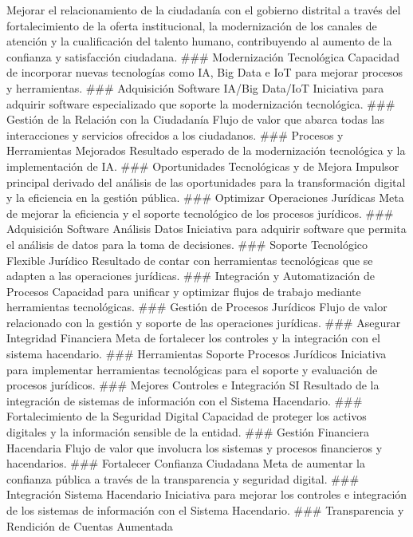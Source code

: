 \documentclass[
	a4paper, %
	12pt, %
]{include/CSSullivanBusinessReport}
\begin{document}
Mejorar el relacionamiento de la ciudadanía con el gobierno distrital a
través del fortalecimiento de la oferta institucional, la modernización
de los canales de atención y la cualificación del talento humano,
contribuyendo al aumento de la confianza y satisfacción ciudadana.
\#\#\# Modernización Tecnológica Capacidad de incorporar nuevas
tecnologías como IA, Big Data e IoT para mejorar procesos y
herramientas. \#\#\# Adquisición Software IA/Big Data/IoT Iniciativa
para adquirir software especializado que soporte la modernización
tecnológica. \#\#\# Gestión de la Relación con la Ciudadanía Flujo de
valor que abarca todas las interacciones y servicios ofrecidos a los
ciudadanos. \#\#\# Procesos y Herramientas Mejorados Resultado esperado
de la modernización tecnológica y la implementación de IA. \#\#\#
Oportunidades Tecnológicas y de Mejora Impulsor principal derivado del
análisis de las oportunidades para la transformación digital y la
eficiencia en la gestión pública. \#\#\# Optimizar Operaciones Jurídicas
Meta de mejorar la eficiencia y el soporte tecnológico de los procesos
jurídicos. \#\#\# Adquisición Software Análisis Datos Iniciativa para
adquirir software que permita el análisis de datos para la toma de
decisiones. \#\#\# Soporte Tecnológico Flexible Jurídico Resultado de
contar con herramientas tecnológicas que se adapten a las operaciones
jurídicas. \#\#\# Integración y Automatización de Procesos Capacidad
para unificar y optimizar flujos de trabajo mediante herramientas
tecnológicas. \#\#\# Gestión de Procesos Jurídicos Flujo de valor
relacionado con la gestión y soporte de las operaciones jurídicas.
\#\#\# Asegurar Integridad Financiera Meta de fortalecer los controles y
la integración con el sistema hacendario. \#\#\# Herramientas Soporte
Procesos Jurídicos Iniciativa para implementar herramientas tecnológicas
para el soporte y evaluación de procesos jurídicos. \#\#\# Mejores
Controles e Integración SI Resultado de la integración de sistemas de
información con el Sistema Hacendario. \#\#\# Fortalecimiento de la
Seguridad Digital Capacidad de proteger los activos digitales y la
información sensible de la entidad. \#\#\# Gestión Financiera Hacendaria
Flujo de valor que involucra los sistemas y procesos financieros y
hacendarios. \#\#\# Fortalecer Confianza Ciudadana Meta de aumentar la
confianza pública a través de la transparencia y seguridad digital.
\#\#\# Integración Sistema Hacendario Iniciativa para mejorar los
controles e integración de los sistemas de información con el Sistema
Hacendario. \#\#\# Transparencia y Rendición de Cuentas Aumentada
\end{document}
